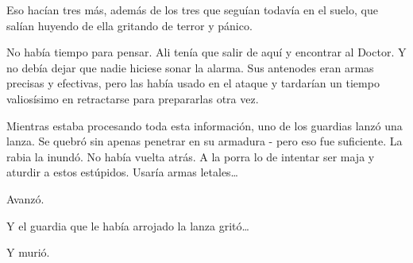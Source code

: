 Eso hacían tres más, además de los tres que seguían todavía en el suelo,
que salían huyendo de ella gritando de terror y pánico.

No había tiempo para pensar. Ali tenía que salir de aquí y encontrar al
Doctor. Y no debía dejar que nadie hiciese sonar la alarma. Sus
antenodes eran armas precisas y efectivas, pero las había usado en el
ataque y tardarían un tiempo valiosísimo en retractarse para prepararlas
otra vez.

Mientras estaba procesando toda esta información, uno de los guardias
lanzó una lanza. Se quebró sin apenas penetrar en su armadura - pero eso
fue suficiente. La rabia la inundó. No había vuelta atrás. A la porra lo
de intentar ser maja y aturdir a estos estúpidos. Usaría armas
letales\ldots{}

Avanzó.

Y el guardia que le había arrojado la lanza gritó\ldots{}

Y murió.